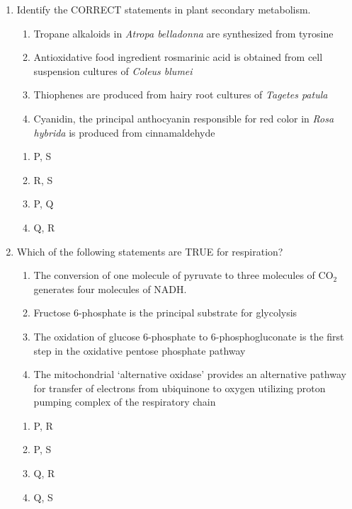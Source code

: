 \documentclass[journal,12pt,onecolumn]{IEEEtran}
\begin{document}
\begin{enumerate}[label=\arabic*.]
\item Identify the CORRECT statements in plant secondary metabolism.
\begin{enumerate}[label=\Alph*. ,start=16]
\item Tropane alkaloids in \textit{Atropa belladonna} are synthesized from tyrosine
\item Antioxidative food ingredient rosmarinic acid is obtained from cell suspension cultures of \textit{Coleus blumei}
\item Thiophenes are produced from hairy root cultures of \textit{Tagetes patula}
\item Cyanidin, the principal anthocyanin responsible for red color in \textit{Rosa hybrida} is produced from cinnamaldehyde
\end{enumerate}
\begin{multicols}{4}
\begin{enumerate}[label=(\Alph*)]
\item P, S
\item R, S
\item P, Q
\item Q, R
\end{enumerate}
\end{multicols}

\item Which of the following statements are TRUE for respiration?

\begin{enumerate}[label=\Alph*. ,start=16]
\item The conversion of one molecule of pyruvate to three molecules of CO$_2$ generates four molecules of NADH.
\item Fructose 6-phosphate is the principal substrate for glycolysis
\item The oxidation of glucose 6-phosphate to 6-phosphogluconate is the first step in the oxidative pentose phosphate pathway
\item The mitochondrial ‘alternative oxidase’ provides an alternative pathway for transfer of electrons from ubiquinone to oxygen utilizing proton pumping complex of the respiratory chain
\end{enumerate}
\begin{multicols}{4}
\begin{enumerate}[label=(\Alph*)]
\item P, R
\item P, S
\item Q, R
\item Q, S
\end{enumerate}
\end{multicols}


\end{enumerate}
\end{document}
